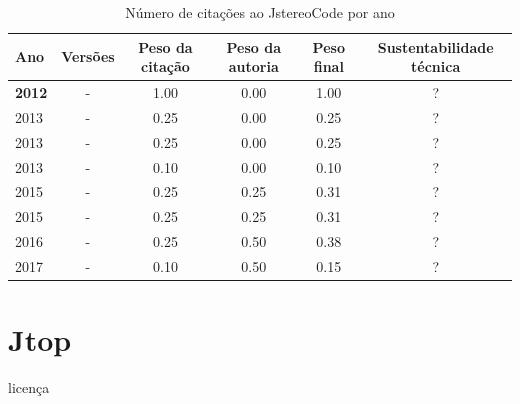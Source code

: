 \begin{table}[H]
\caption{Número de citações ao JstereoCode por ano}
\centering
\begin{tabular}{| l | c | c | c | c | c |}
  \hline
  Ano & Versões & Peso da citação & Peso da autoria & Peso final & Sustentabilidade técnica \\
  \hline
            {\bf 2012}
          &
          -
          &
          1.00
          &
          0.00
          &
            {\color{blue} 1.00}
          &
          ?
          \\
\hline
            2013
          &
          -
          &
          0.25
          &
          0.00
          &
            {\color{red} 0.25}
          &
          ?
          \\
            2013
          &
          -
          &
          0.25
          &
          0.00
          &
            {\color{red} 0.25}
          &
          ?
          \\
            2013
          &
          -
          &
          0.10
          &
          0.00
          &
            {\color{red} 0.10}
          &
          ?
          \\
\hline
            2015
          &
          -
          &
          0.25
          &
          0.25
          &
            {\color{red} 0.31}
          &
          ?
          \\
            2015
          &
          -
          &
          0.25
          &
          0.25
          &
            {\color{red} 0.31}
          &
          ?
          \\
\hline
            2016
          &
          -
          &
          0.25
          &
          0.50
          &
            {\color{red} 0.38}
          &
          ?
          \\
\hline
            2017
          &
          -
          &
          0.10
          &
          0.50
          &
            {\color{red} 0.15}
          &
          ?
          \\
\hline
\end{tabular}
\end{table}



\section{Jtop}
\checkmark licença



